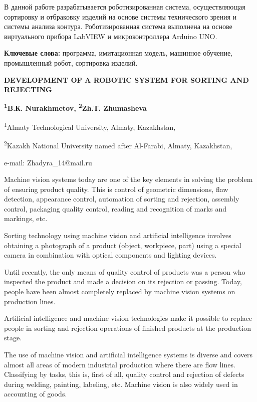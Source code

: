 В данной работе разрабатывается роботизированная система, осуществляющая
сортировку и отбраковку изделий на основе системы технического зрения и
системы анализа контура. Роботизированная система выполнена на основе
виртуального прибора LabVIEW и микроконтроллера Arduino UNO.

{\bfseries Ключевые слова:} программа, имитационная модель, машинное обучение,
промышленный робот, сортировка изделий.

\begin{articleheader}
{\bfseries DEVELOPMENT OF A ROBOTIC SYSTEM FOR SORTING AND REJECTING}

{\bfseries
\textsuperscript{1}B.К. Nurakhmetov,
\textsuperscript{2}Zh.Т. Zhumasheva\textsuperscript{\envelope }
}
\end{articleheader}

\begin{affiliation}
\textsuperscript{1}Almaty Technological University, Almaty, Kazakhstan,

\textsuperscript{2}Kazakh National University named after Al-Farabi, Almaty, Kazakhstan,

e-mail: Zhadyra\_14@mail.ru
\end{affiliation}

Machine vision systems today are one of the key elements in solving the
problem of ensuring product quality. This is control of geometric
dimensions, flaw detection, appearance control, automation of sorting
and rejection, assembly control, packaging quality control, reading and
recognition of marks and markings, etc.

Sorting technology using machine vision and artificial intelligence
involves obtaining a photograph of a product (object, workpiece, part)
using a special camera in combination with optical components and
lighting devices.

Until recently, the only means of quality control of products was a
person who inspected the product and made a decision on its rejection or
passing. Today, people have been almost completely replaced by machine
vision systems on production lines.

Artificial intelligence and machine vision technologies make it possible
to replace people in sorting and rejection operations of finished
products at the production stage.

The use of machine vision and artificial intelligence systems is diverse
and covers almost all areas of modern industrial production where there
are flow lines. Classifying by tasks, this is, first of all, quality
control and rejection of defects during welding, painting, labeling,
etc. Machine vision is also widely used in accounting of goods.

